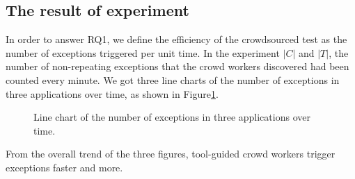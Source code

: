 \subsection{The result of experiment}
In order to answer RQ1, we define the efficiency of the crowdsourced test as the number of exceptions triggered per unit time. In the experiment $\left|C\right|$ and $\left|T\right|$, the number of non-repeating exceptions that the crowd workers discovered had been counted every minute. We got three line charts of the number of exceptions in three applications over time, as shown in Figure\ref{fig:xi}.
\begin{figure}[htbp]
\centering
{}%
%
%
\centering
\caption{Line chart of the number of exceptions in three applications over time.}
\label{fig:xi}
\end{figure}

From the overall trend of the three figures, tool-guided crowd workers trigger exceptions faster and more.

